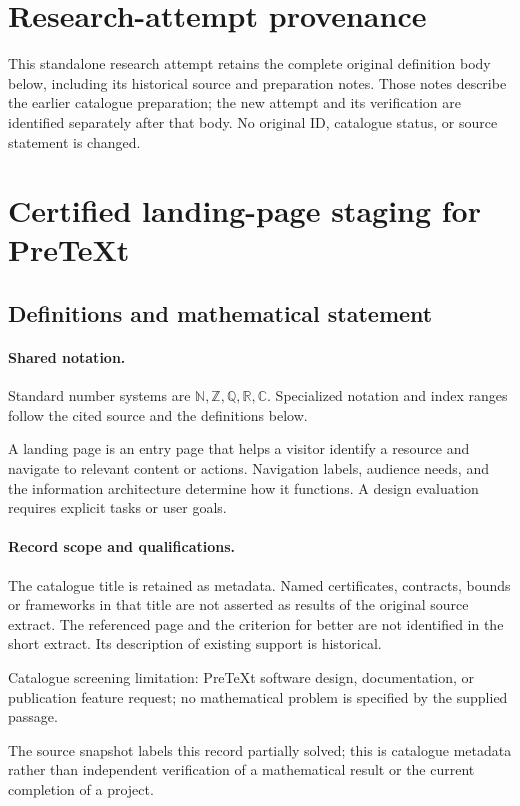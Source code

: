 \documentclass[11pt]{article}
\begin{document}
\section*{Research-attempt provenance}
This standalone research attempt retains the complete original definition body below,
including its historical source and preparation notes. Those notes describe the
earlier catalogue preparation; the new attempt and its verification are identified
separately after that body. No original ID, catalogue status, or source statement is changed.

\section{Certified landing-page staging for PreTeXt}\label{statement}

\subsection{Definitions and mathematical statement}

\paragraph{Shared notation.}Standard number systems are $\mathbb N,\mathbb Z,\mathbb Q,\mathbb R,\mathbb C$. Specialized notation and index ranges follow the cited source and the definitions below.


A landing page is an entry page that helps a visitor identify a resource and navigate to relevant content or actions. Navigation labels, audience needs, and the information architecture determine how it functions. A design evaluation requires explicit tasks or user goals.
\paragraph{Record scope and qualifications.}
The catalogue title is retained as metadata. Named certificates, contracts, bounds or frameworks in that title are not asserted as results of the original source extract.
The referenced page and the criterion for better are not identified in the short extract. Its description of existing support is historical.

Catalogue screening limitation: PreTeXt software design, documentation, or publication feature request; no mathematical problem is specified by the supplied passage.

The source snapshot labels this record partially solved; this is catalogue metadata rather than independent verification of a mathematical result or the current completion of a project.
\end{document}
